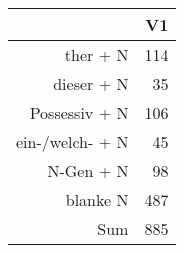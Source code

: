 \begin{tabular}{rr}
  \hline
 & V1 \\ 
  \hline
ther + N & 114 \\ 
  dieser + N &  35 \\ 
  Possessiv + N & 106 \\ 
  ein-/welch- + N &  45 \\ 
  N-Gen + N &  98 \\ 
  blanke N & 487 \\ 
  Sum & 885 \\ 
   \hline
\end{tabular}
